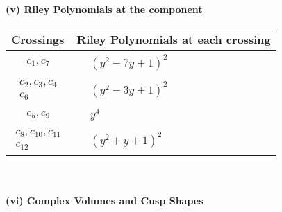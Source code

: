 \documentclass[1p]{elsarticle_modified}
\theoremstyle{definition}
\begin{document}
\newpage\renewcommand{\arraystretch}{1}
\flushleft \textbf{(v) Riley Polynomials at the component}\newline \\
\begin{tabular}{m{50pt}|m{274pt}}
Crossings & \hspace{64pt}Riley Polynomials at each crossing \\
\hline $$\begin{aligned}c_{1},c_{7}\end{aligned}$$&$\begin{aligned}
&(y^2-7 y+1)^2
\end{aligned}$\\
\hline $$\begin{aligned}c_{2},c_{3},c_{4}\\c_{6}\end{aligned}$$&$\begin{aligned}
&(y^2-3 y+1)^2
\end{aligned}$\\
\hline $$\begin{aligned}c_{5},c_{9}\end{aligned}$$&$\begin{aligned}
&y^4
\end{aligned}$\\
\hline $$\begin{aligned}c_{8},c_{10},c_{11}\\c_{12}\end{aligned}$$&$\begin{aligned}
&(y^2+y+1)^2
\end{aligned}$\\
\hline
\end{tabular}\\~\\
\newpage\flushleft \textbf{(vi) Complex Volumes and Cusp Shapes}
\end{document}
